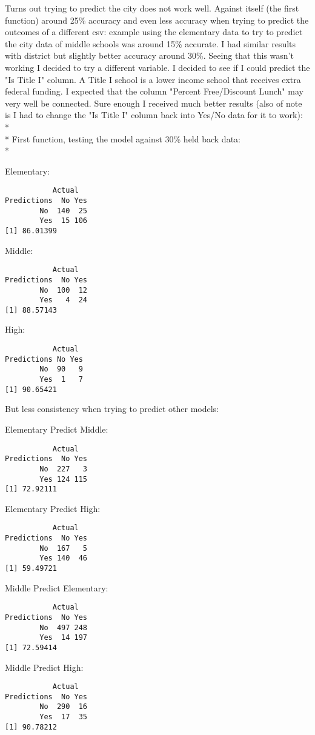 \documentclass[10pt]{article}
\begin{document}
Turns out trying to predict the city does not work well. Against itself (the first function) around 25\% accuracy and even less accuracy when trying to predict the outcomes of a different csv: example using the elementary data to try to predict the city data of middle schools was around 15\% accurate. I had similar results with district but slightly better accuracy around 30\%. Seeing that this wasn't working I decided to try a different variable. I decided to see if I could predict the "Is Title I" column. A Title I school is a lower income school that receives extra federal funding. I expected that the column "Percent Free/Discount Lunch" may very well be connected. Sure enough I received much better results (also of note is I had to change the "Is Title I" column back into Yes/No data for it to work):
\\*
\\*
First function, testing the model against 30\% held back data:\\*
\begin{multicols}{3}
Elementary:
\begin{verbatim}
           Actual
Predictions  No Yes
        No  140  25
        Yes  15 106
[1] 86.01399
\end{verbatim}
Middle:
\begin{verbatim}
           Actual
Predictions  No Yes
        No  100  12
        Yes   4  24
[1] 88.57143
\end{verbatim}
High:
\begin{verbatim}
           Actual
Predictions No Yes
        No  90   9
        Yes  1   7
[1] 90.65421
\end{verbatim}
\end{multicols}
But less consistency when trying to predict other models:
\begin{multicols}{2}
Elementary Predict Middle:
\begin{verbatim}
           Actual
Predictions  No Yes
        No  227   3
        Yes 124 115
[1] 72.92111
\end{verbatim}
Elementary Predict High:
\begin{verbatim}
           Actual
Predictions  No Yes
        No  167   5
        Yes 140  46
[1] 59.49721
\end{verbatim}
\end{multicols}
\begin{multicols}{2}
Middle Predict Elementary:
\begin{verbatim}
           Actual
Predictions  No Yes
        No  497 248
        Yes  14 197
[1] 72.59414
\end{verbatim}
Middle Predict High:
\begin{verbatim}
           Actual
Predictions  No Yes
        No  290  16
        Yes  17  35
[1] 90.78212
\end{verbatim}
\end{multicols}
\end{document}

